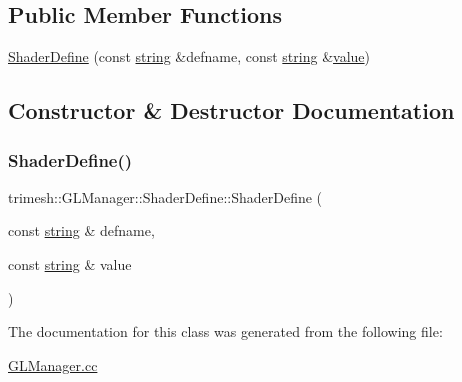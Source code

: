 \subsection*{Public Member Functions}
\begin{DoxyCompactItemize}
\item 
\hyperlink{classtrimesh_1_1GLManager_1_1ShaderDefine_a836735e4246e1a65cc9eef50954e168a}{Shader\+Define} (const \hyperlink{namespacetrimesh_a51b4a31323874089623d4b17afabc1aa}{string} \&defname, const \hyperlink{namespacetrimesh_a51b4a31323874089623d4b17afabc1aa}{string} \&\hyperlink{namespacetrimesh_ab10cc1052c9d1d1376d92211b6ca27dd}{value})
\end{DoxyCompactItemize}


\subsection{Constructor \& Destructor Documentation}
\mbox{\label{classtrimesh_1_1GLManager_1_1ShaderDefine_a836735e4246e1a65cc9eef50954e168a}} 
\subsubsection{\texorpdfstring{Shader\+Define()}{ShaderDefine()}}
{\footnotesize\ttfamily trimesh\+::\+G\+L\+Manager\+::\+Shader\+Define\+::\+Shader\+Define (\begin{DoxyParamCaption}\item[{const \hyperlink{namespacetrimesh_a51b4a31323874089623d4b17afabc1aa}{string} \&}]{defname,  }\item[{const \hyperlink{namespacetrimesh_a51b4a31323874089623d4b17afabc1aa}{string} \&}]{value }\end{DoxyParamCaption})\hspace{0.3cm}{\ttfamily [inline]}}



The documentation for this class was generated from the following file\+:\begin{DoxyCompactItemize}
\item 
\hyperlink{GLManager_8cc}{G\+L\+Manager.\+cc}\end{DoxyCompactItemize}
